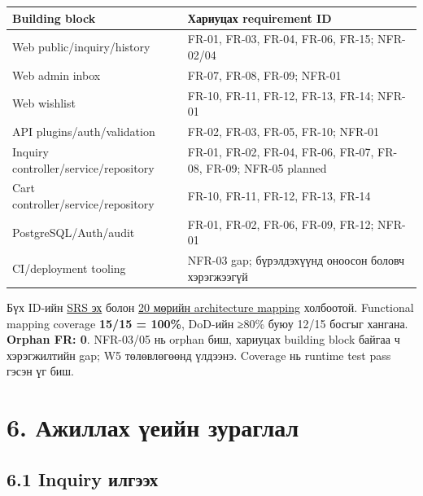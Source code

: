 \documentclass[
  mongolian,
]{article}
\begin{document}
\begin{longtable}[]{@{}
  >{\raggedright\arraybackslash}p{}
  >{\raggedright\arraybackslash}p{}@{}}
\toprule\noalign{}
\begin{minipage}[b]{\linewidth}\raggedright
Building block
\end{minipage} & \begin{minipage}[b]{\linewidth}\raggedright
Хариуцах requirement ID
\end{minipage} \\
\midrule\noalign{}
\endhead
\bottomrule\noalign{}
\endlastfoot
Web public/inquiry/history & FR-01, FR-03, FR-04, FR-06, FR-15;
NFR-02/04 \\
Web admin inbox & FR-07, FR-08, FR-09; NFR-01 \\
Web wishlist & FR-10, FR-11, FR-12, FR-13, FR-14; NFR-01 \\
API plugins/auth/validation & FR-02, FR-03, FR-05, FR-10; NFR-01 \\
Inquiry controller/service/repository & FR-01, FR-02, FR-04, FR-06,
FR-07, FR-08, FR-09; NFR-05 planned \\
Cart controller/service/repository & FR-10, FR-11, FR-12, FR-13,
FR-14 \\
PostgreSQL/Auth/audit & FR-01, FR-02, FR-06, FR-09, FR-12; NFR-01 \\
CI/deployment tooling & NFR-03 gap; бүрэлдэхүүнд оноосон боловч
хэрэгжээгүй \\
\end{longtable}

Бүх ID-ийн
\href{https://github.com/Tengis01/Nogoolin/blob/main/docs/requirements/srs-v1.0.md}{SRS
эх} болон
\href{https://github.com/Tengis01/Nogoolin/blob/main/docs/architecture/architecture-traceability.md}{20
мөрийн architecture mapping} холбоотой. Functional mapping coverage
\textbf{15/15 = 100\%}, DoD-ийн ≥80\% буюу 12/15 босгыг хангана.
\textbf{Orphan FR: 0}. NFR-03/05 нь orphan биш, хариуцах building block
байгаа ч хэрэгжилтийн gap; W5 төлөвлөгөөнд үлдээнэ. Coverage нь runtime
test pass гэсэн үг биш.

\section{6. Ажиллах үеийн
зураглал}\label{ux430ux436ux438ux43bux43bux430ux445-ux4afux435ux438ux439ux43d-ux437ux443ux440ux430ux433ux43bux430ux43b}

\subsection{6.1 Inquiry
илгээх}\label{inquiry-ux438ux43bux433ux44dux44dux445}
\end{document}
